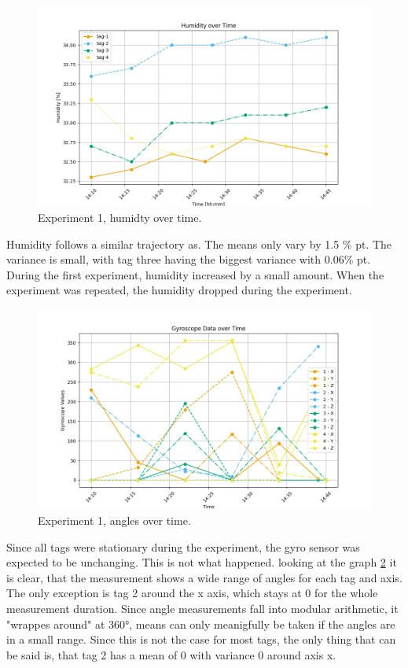\begin{figure}[ht!]
\includegraphics[width=\linewidth]{graphics/exp/exp1_hum_plot_0.png}
 \caption{Experiment 1, humidty over time.}
\label{f:exp1_graphs_hum}
\end{figure}

Humidity follows a similar trajectory as.
The means only vary by 1.5 \% pt.
The variance is small, with tag three having the biggest variance with 0.06\% pt.
During the first experiment, humidity increased by a small amount.
When the experiment was repeated, the humidity dropped during the experiment.


\begin{figure}[ht!]
\includegraphics[width=\linewidth]{graphics/exp/exp1_gyro_data_plot_0.png}
 \caption{Experiment 1, angles over time.}
\label{f:exp1_graphs_gyro}
\end{figure}

Since all tags were stationary during the experiment, the gyro sensor was expected to be unchanging.
This is not what happened.
looking at the graph \ref{f:exp1_graphs_gyro} it is clear, that the measurement shows a wide range of angles for each tag and axis.
The only exception is tag 2 around the x axis, which stays at 0 for the whole measurement duration.
Since angle measurements fall into modular arithmetic, it "wrappes around" at 360°, means can only meanigfully be taken if the angles are in a small range.
Since this is not the case for most tags, the only thing that can be said is, that tag 2 has a mean of 0 with variance 0 around axis x.


